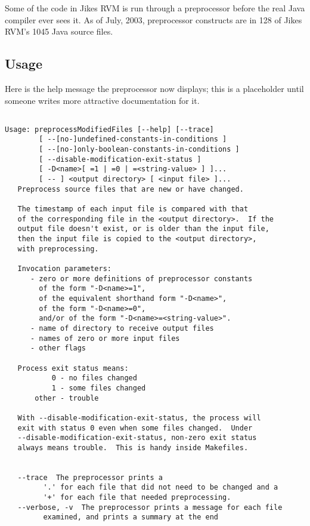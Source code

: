 Some of the code in Jikes RVM is run through a preprocessor before the
real Java compiler ever sees it.  As of July, 2003, preprocessor
constructs are in 128 of Jikes RVM's 1045 Java source files.

\subsection{Usage}

Here is the help message the preprocessor now displays; this
is a placeholder until someone writes more attractive documentation
for it.

\begin{verbatim}

Usage: preprocessModifiedFiles [--help] [--trace]
        [ --[no-]undefined-constants-in-conditions ]
        [ --[no-]only-boolean-constants-in-conditions ]
        [ --disable-modification-exit-status ]
        [ -D<name>[ =1 | =0 | =<string-value> ] ]...
        [ -- ] <output directory> [ <input file> ]...
   Preprocess source files that are new or have changed.

   The timestamp of each input file is compared with that
   of the corresponding file in the <output directory>.  If the
   output file doesn't exist, or is older than the input file,
   then the input file is copied to the <output directory>, 
   with preprocessing.

   Invocation parameters:
      - zero or more definitions of preprocessor constants
        of the form "-D<name>=1",
        of the equivalent shorthand form "-D<name>", 
        of the form "-D<name>=0",
        and/or of the form "-D<name>=<string-value>".
      - name of directory to receive output files
      - names of zero or more input files
      - other flags

   Process exit status means:
           0 - no files changed
           1 - some files changed
       other - trouble

   With --disable-modification-exit-status, the process will
   exit with status 0 even when some files changed.  Under
   --disable-modification-exit-status, non-zero exit status
   always means trouble.  This is handy inside Makefiles.


   --trace  The preprocessor prints a 
         '.' for each file that did not need to be changed and a 
         '+' for each file that needed preprocessing.
   --verbose, -v  The preprocessor prints a message for each file
         examined, and prints a summary at the end 


\end{verbatim}

